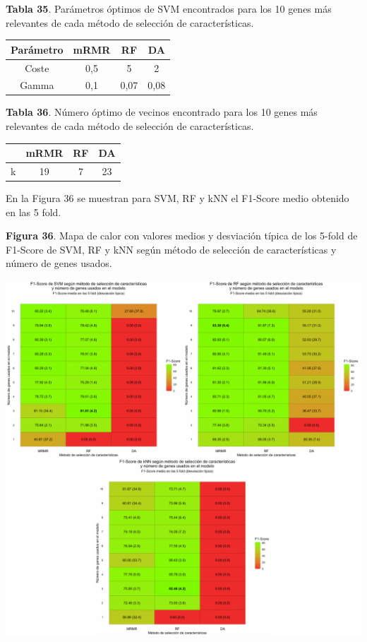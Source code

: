 \textbf{Tabla 35}. Parámetros óptimos de SVM encontrados para los 10 genes más relevantes de cada método de selección de características.

\begin{table}[H]
	\centering
	\begin{tabular}{cccc}
		\hline
		\textbf{Parámetro} & \textbf{mRMR} & \textbf{RF} & \textbf{DA} \\ \hline
		Coste                &    0,5 &    5     &  2       \\
		Gamma               &     0,1   &     0,07   & 0,08        \\ \hline
	\end{tabular}
\end{table}

\textbf{Tabla 36}. Número óptimo de vecinos encontrado para los 10 genes más relevantes de cada método de selección de características.

\begin{table}[H]
	\centering
	\begin{tabular}{cccc}
		\cline{2-4}
		\textbf{} & \textbf{mRMR} & \textbf{RF} & \textbf{DA} \\ \hline
		k                &   19 &   7     &   23      \\ \hline
	\end{tabular}
\end{table}

En la Figura 36 se muestran para SVM, RF y kNN el F1-Score medio obtenido en las 5 fold.

\begin{center}
	\textbf{Figura 36}. Mapa de calor con valores medios y desviación típica de los 5-fold de F1-Score de SVM, RF y kNN según método de selección de características y número de genes usados.
\end{center}
\begin{center}
	\includegraphics[width=1\textwidth]{figuras/36_cr_multiclase_heatmap_horizontal.pdf} 
\end{center}

